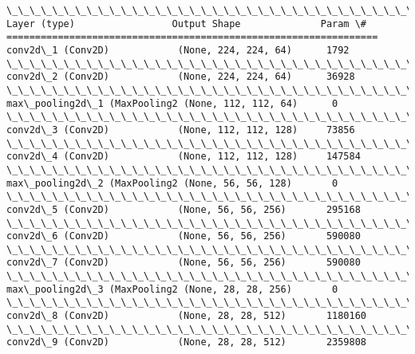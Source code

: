 \documentclass[11pt]{article}
\begin{document}
    \begin{Verbatim}[commandchars=\\\{\}]
\_\_\_\_\_\_\_\_\_\_\_\_\_\_\_\_\_\_\_\_\_\_\_\_\_\_\_\_\_\_\_\_\_\_\_\_\_\_\_\_\_\_\_\_\_\_\_\_\_\_\_\_\_\_\_\_\_\_\_\_\_\_\_\_\_
Layer (type)                 Output Shape              Param \#   
=================================================================
conv2d\_1 (Conv2D)            (None, 224, 224, 64)      1792      
\_\_\_\_\_\_\_\_\_\_\_\_\_\_\_\_\_\_\_\_\_\_\_\_\_\_\_\_\_\_\_\_\_\_\_\_\_\_\_\_\_\_\_\_\_\_\_\_\_\_\_\_\_\_\_\_\_\_\_\_\_\_\_\_\_
conv2d\_2 (Conv2D)            (None, 224, 224, 64)      36928     
\_\_\_\_\_\_\_\_\_\_\_\_\_\_\_\_\_\_\_\_\_\_\_\_\_\_\_\_\_\_\_\_\_\_\_\_\_\_\_\_\_\_\_\_\_\_\_\_\_\_\_\_\_\_\_\_\_\_\_\_\_\_\_\_\_
max\_pooling2d\_1 (MaxPooling2 (None, 112, 112, 64)      0         
\_\_\_\_\_\_\_\_\_\_\_\_\_\_\_\_\_\_\_\_\_\_\_\_\_\_\_\_\_\_\_\_\_\_\_\_\_\_\_\_\_\_\_\_\_\_\_\_\_\_\_\_\_\_\_\_\_\_\_\_\_\_\_\_\_
conv2d\_3 (Conv2D)            (None, 112, 112, 128)     73856     
\_\_\_\_\_\_\_\_\_\_\_\_\_\_\_\_\_\_\_\_\_\_\_\_\_\_\_\_\_\_\_\_\_\_\_\_\_\_\_\_\_\_\_\_\_\_\_\_\_\_\_\_\_\_\_\_\_\_\_\_\_\_\_\_\_
conv2d\_4 (Conv2D)            (None, 112, 112, 128)     147584    
\_\_\_\_\_\_\_\_\_\_\_\_\_\_\_\_\_\_\_\_\_\_\_\_\_\_\_\_\_\_\_\_\_\_\_\_\_\_\_\_\_\_\_\_\_\_\_\_\_\_\_\_\_\_\_\_\_\_\_\_\_\_\_\_\_
max\_pooling2d\_2 (MaxPooling2 (None, 56, 56, 128)       0         
\_\_\_\_\_\_\_\_\_\_\_\_\_\_\_\_\_\_\_\_\_\_\_\_\_\_\_\_\_\_\_\_\_\_\_\_\_\_\_\_\_\_\_\_\_\_\_\_\_\_\_\_\_\_\_\_\_\_\_\_\_\_\_\_\_
conv2d\_5 (Conv2D)            (None, 56, 56, 256)       295168    
\_\_\_\_\_\_\_\_\_\_\_\_\_\_\_\_\_\_\_\_\_\_\_\_\_\_\_\_\_\_\_\_\_\_\_\_\_\_\_\_\_\_\_\_\_\_\_\_\_\_\_\_\_\_\_\_\_\_\_\_\_\_\_\_\_
conv2d\_6 (Conv2D)            (None, 56, 56, 256)       590080    
\_\_\_\_\_\_\_\_\_\_\_\_\_\_\_\_\_\_\_\_\_\_\_\_\_\_\_\_\_\_\_\_\_\_\_\_\_\_\_\_\_\_\_\_\_\_\_\_\_\_\_\_\_\_\_\_\_\_\_\_\_\_\_\_\_
conv2d\_7 (Conv2D)            (None, 56, 56, 256)       590080    
\_\_\_\_\_\_\_\_\_\_\_\_\_\_\_\_\_\_\_\_\_\_\_\_\_\_\_\_\_\_\_\_\_\_\_\_\_\_\_\_\_\_\_\_\_\_\_\_\_\_\_\_\_\_\_\_\_\_\_\_\_\_\_\_\_
max\_pooling2d\_3 (MaxPooling2 (None, 28, 28, 256)       0         
\_\_\_\_\_\_\_\_\_\_\_\_\_\_\_\_\_\_\_\_\_\_\_\_\_\_\_\_\_\_\_\_\_\_\_\_\_\_\_\_\_\_\_\_\_\_\_\_\_\_\_\_\_\_\_\_\_\_\_\_\_\_\_\_\_
conv2d\_8 (Conv2D)            (None, 28, 28, 512)       1180160   
\_\_\_\_\_\_\_\_\_\_\_\_\_\_\_\_\_\_\_\_\_\_\_\_\_\_\_\_\_\_\_\_\_\_\_\_\_\_\_\_\_\_\_\_\_\_\_\_\_\_\_\_\_\_\_\_\_\_\_\_\_\_\_\_\_
conv2d\_9 (Conv2D)            (None, 28, 28, 512)       2359808   

\end{Verbatim}
\end{document}
